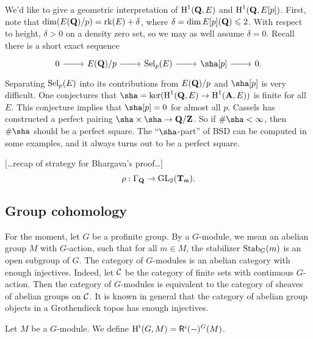 We'd like to give a geometric interpretation of $\operatorname{H}^1(\mathbf{Q},E)$ and 
$\operatorname{H}^1(\mathbf{Q},E[p])$. First, note that 
$\dim (E(\mathbf{Q})/p)=\operatorname{rk}(E)+\delta$, where $\delta=\dim E[p](\mathbf{Q})\leqslant 2$. 
With respect to height, $\delta>0$ on a density zero set, so we may as well 
assume $\delta=0$. Recall there is a short exact sequence 
\[\begin{tikzcd}
  0 \ar[r] 
    & E(\dQ)/p \ar[r] 
    & \selmer_p(E) \ar[r] 
    & \sha[p] \ar[r] 
    & 0 .
\end{tikzcd}\]
Separating $\operatorname{Sel}_p(E)$ into its contributions from $E(\mathbf{Q})/p$ and 
$\sha[p]$ is very difficult. One conjectures that 
$\sha=\ker(\h^1(\dQ,E) \to \h^1(\dA,E))$ is finite for all $E$. This conjecture 
implies that $\sha[p]=0$ for almost all $p$. Cassels has constructed a perfect 
pairing $\sha\times \sha\to \dQ/\dZ$. So if $\#\sha<\infty$, then $\#\sha$ 
should be a perfect square. The ``$\sha$-part'' of BSD can be computed in 
some examples, and it always turns out to be a perfect square. 

[\ldots recap of strategy for Bhargava's proof\ldots]
\[
  \rho:\Gamma_{\mathbf{Q}}\to \operatorname{GL}_2(\mathbf T_\mathfrak m) .
\]





\subsection{Group cohomology}

For the moment, let $G$ be a profinite group. By a $G$-module, we mean 
an abelian group $M$ with $G$-action, such that for all $m\in M$, the 
stabilizer $\operatorname{Stab}_G(m)$ is an open subgroup of $G$. The category of 
$G$-modules is an abelian category with enough injectives. Indeed, let 
$\mathcal{C}$ be the category of finite sets with continuous $G$-action. Then the 
category of $G$-modules is equivalent to the category of sheaves of abelian 
groups on $\mathcal{C}$. It is known in general that the category of abelian group 
objects in a Grothendieck topos has enough injectives. 

\begin{definition}
Let $M$ be a $G$-module. We define $\operatorname{H}^i(G,M)=\mathsf R^i (-)^G(M)$. 
\end{definition}

